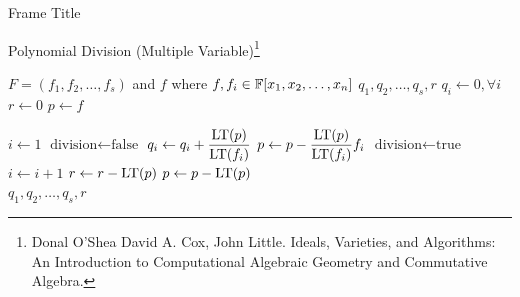 \documentclass[aspectratio=169, handout, 10pt, hyperref=colorlinks]{beamer}
\begin{document}
        \begin{frame}{Frame Title}
        \begin{center}
        \begin{algorithm}[H]\tiny
        \caption{Polynomial Division (Multiple Variable)\footnote{\tiny Donal O’Shea David A. Cox, John Little.
Ideals, Varieties, and Algorithms: An Introduction to Computational Algebraic Geometry and
Commutative Algebra.}}\label{alg:polynomialdivisionmultiple}
        \begin{algorithmic} 
        \Require $F =(f_1,f_2,\ldots,f_s)$ and $f$ where $f,f_i\in\mathbb{F}[x_1, x_2, \ldots, x_n]$
        \Ensure $q_1,q_2,\ldots,q_s,r$
        \State $q_i \gets 0, \forall i$
        \State $r \gets 0$
        \State $p \gets f$
            
            \State $i \gets 1$
            \State $\text{division} \gets \text{false}$
                    \State $q_i \gets q_i+\dfrac{\operatorname{LT}(p)}{\operatorname{LT}(f_i)}$
                    \State $p \gets p-\dfrac{\operatorname{LT}(p)}{\operatorname{LT}(f_i)}f_i$
                    \State $\text{division} \gets \text{true}$
                \Else
                    \State $i \gets i+1$
                \EndIf
            \EndWhile
                \State $r \gets r-\operatorname{LT}(p)$
                \State $p \gets p-\operatorname{LT}(p)$
            \EndIf
        \EndWhile \\
        \Return $q_1,q_2,\ldots,q_s,r$
        \end{algorithmic}
        \end{algorithm}
    \end{center}
\end{frame}
\end{document}
